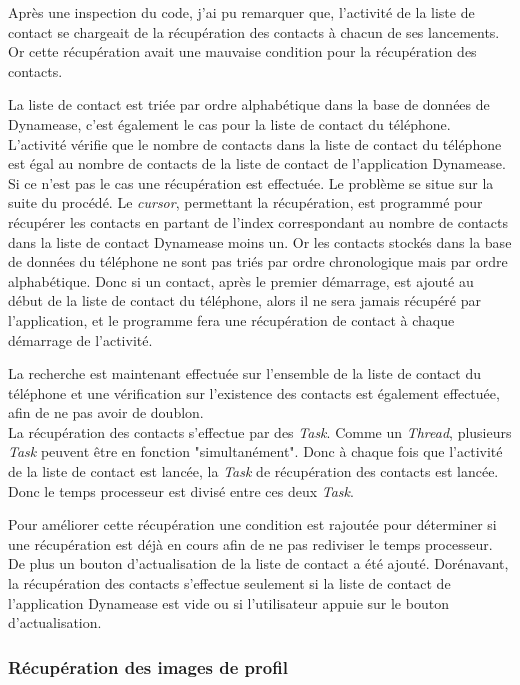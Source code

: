 Après une inspection du code, j'ai pu remarquer que, l'activité de la liste de contact se chargeait de la récupération des contacts à chacun de ses lancements. Or cette récupération avait une mauvaise condition pour la récupération des contacts.

La liste de contact est triée par ordre alphabétique dans la base de données de Dynamease, c'est également le cas pour la liste de contact du téléphone. L'activité vérifie que le nombre de contacts dans la liste de contact du téléphone est égal au nombre de contacts de la liste de contact de l'application Dynamease. Si ce n'est pas le cas une récupération est effectuée. Le problème se situe sur la suite du procédé. Le \textit{cursor}, permettant la récupération, est programmé pour récupérer les contacts en partant de l'index correspondant au nombre de contacts dans la liste de contact Dynamease moins un. Or les contacts stockés dans la base de données du téléphone ne sont pas triés par ordre chronologique mais par ordre alphabétique. Donc si un contact, après le premier démarrage, est ajouté au début de la liste de contact du téléphone, alors il ne sera jamais récupéré par l'application, et le programme fera une récupération de contact à chaque démarrage de l'activité.

La recherche est maintenant effectuée sur l'ensemble de la liste de contact du téléphone et une vérification sur l'existence des contacts est également effectuée, afin de ne pas avoir de doublon.\\

La récupération des contacts s'effectue par des \textit{Task}. Comme un \textit{Thread}, plusieurs \textit{Task} peuvent être en fonction "simultanément". Donc à chaque fois que l'activité de la liste de contact est lancée, la \textit{Task} de récupération des contacts est lancée. Donc le temps processeur est divisé entre ces deux \textit{Task}.

Pour améliorer cette récupération une condition est rajoutée pour déterminer si une récupération est déjà en cours afin de ne pas rediviser le temps processeur. De plus un bouton d'actualisation de la liste de contact a été ajouté. Dorénavant, la récupération des contacts s'effectue seulement si la liste de contact de l'application Dynamease est vide ou si l'utilisateur appuie sur le bouton d'actualisation.

\subsubsection{Récupération des images de profil}

